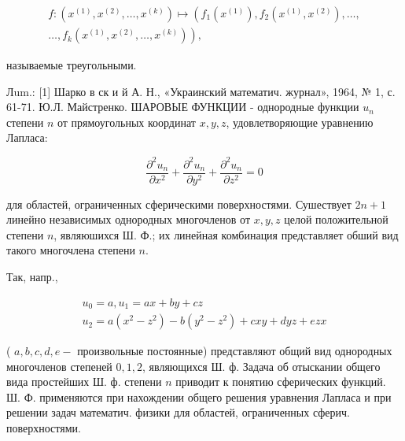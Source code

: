 \documentclass[10pt]{article}
\begin{document}
\[

\begin{gathered}

f:\left(x^{(1)}, x^{(2)}, \ldots, x^{(k)}\right) \mapsto\left(f_{1}\left(x^{(1)}\right), f_{2}\left(x^{(1)}, x^{(2)}\right), \ldots,\right. \\

\left.\ldots, f_{k}\left(x^{(1)}, x^{(2)}, \ldots, x^{(k)}\right)\right),

\end{gathered}

\]



называемые треугольными.



Лum.: [1] Шарко в ск и й А. Н., «Украинский математич. журнал», 1964, № 1, с. 61-71. Ю.Л. Майстренко. ШАРОВЫЕ ФУНКЦИИ - однородные функции $u_{n}$ степени $n$ от прямоугольных координат $x, y, z$, удовлетворяющие уравнению Лапласа:



\[

\frac{\partial^{2} u_{n}}{\partial x^{2}}+\frac{\partial^{2} u_{n}}{\partial y^{2}}+\frac{\partial^{2} u_{n}}{\partial z^{2}}=0

\]



для областей, ограниченных сферическими поверхностями. Сушествует $2 n+1$ линейно независимых однородных многочленов от $x, y, z$ целой положительной степени $n$, являюшихся Ш. Ф.; их линейная комбинация представляет обший вид такого многочлена степени $n$.



Так, напр.,



\[

\begin{gathered}

u_{0}=a, u_{1}=a x+b y+c z \\

u_{2}=a\left(x^{2}-z^{2}\right)-b\left(y^{2}-z^{2}\right)+c x y+d y z+e z x

\end{gathered}

\]



( $a, b, c, d, e-$ произвольные постоянные) представляют общий вид однородных многочленов степеней $0,1,2$, являющихся Ш. ф. Задача об отыскании общего вида простейших Ш. ф. степени $n$ приводит к понятию сферических функций. Ш. Ф. применяются при нахождении общего решения уравнения Лапласа и при решении задач математич. физики для областей, ограниченных сферич. поверхностями.
\end{document}
